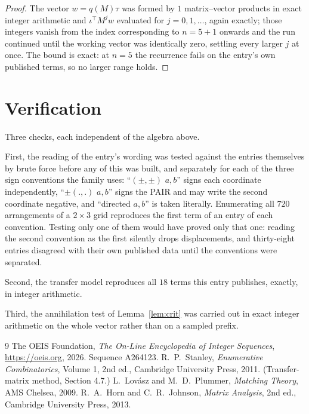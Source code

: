 \documentclass[11pt,a4paper]{article}
\theoremstyle{plain}
\theoremstyle{definition}
\begin{document}
\begin{proof}
The vector $w=q(M)\tau$ was formed by $1$ matrix--vector products in exact integer
arithmetic and $\iota^{\!\top}M^{j}w$ evaluated for $j=0,1,\dots$, again exactly; those
integers vanish from the index corresponding to $n=5+1$ onwards and the run continued
until the working vector was identically zero, settling every larger $j$ at once. The bound is exact: at $n=5$ the recurrence fails on the entry's own published terms, so no larger range holds.
\end{proof}

\section{Verification}

Three checks, each independent of the algebra above.

First, the reading of the entry's wording was tested against the entries themselves by brute
force before any of this was built, and separately for each of the three sign conventions the
family uses: ``$(\pm,\pm)$ $a,b$'' signs each coordinate independently, ``$\pm(.,.)$ $a,b$''
signs the PAIR and may write the second coordinate negative, and ``directed $a,b$'' is taken
literally. Enumerating all $720$ arrangements of a $2\times3$ grid reproduces the first term
of an entry of each convention. Testing only one of them would have proved only that one:
reading the second convention as the first silently drops displacements, and thirty-eight
entries disagreed with their own published data until the conventions were separated.

Second, the transfer model reproduces all $18$ terms this entry publishes, exactly, in
integer arithmetic.

Third, the annihilation test of Lemma~\ref{lem:crit} was carried out in exact integer
arithmetic on the whole vector rather than on a sampled prefix.

\begin{thebibliography}{9}
 The OEIS Foundation, \emph{The On-Line Encyclopedia of Integer
Sequences}, \url{https://oeis.org}, 2026. Sequence A264123.
 R.~P.~Stanley, \emph{Enumerative Combinatorics}, Volume 1, 2nd ed.,
Cambridge University Press, 2011. (Transfer-matrix method, Section 4.7.)
 L.~Lov\'asz and M.~D.~Plummer, \emph{Matching Theory}, AMS Chelsea, 2009.
 R.~A.~Horn and C.~R.~Johnson, \emph{Matrix Analysis}, 2nd ed., Cambridge
University Press, 2013.
\end{thebibliography}
\end{document}
